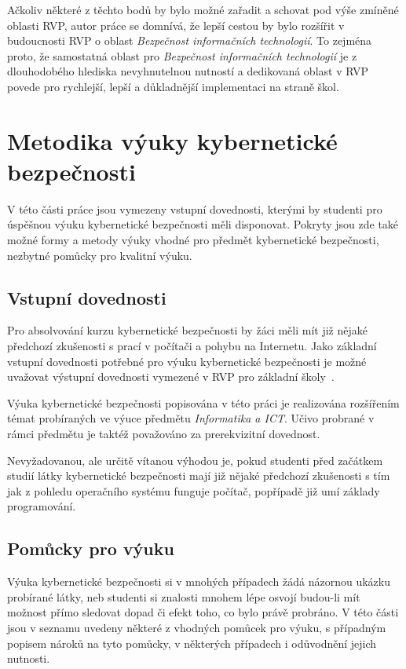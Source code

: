 \documentclass[a4paper, 12pt]{article}
\begin{document}
Ačkoliv některé z těchto bodů by bylo možné zařadit a schovat pod výše zmíněné oblasti RVP, autor práce se domnívá, že lepší cestou by bylo rozšířit v budoucnosti RVP o oblast \textit{Bezpečnost informačních technologií}. To zejména proto, že samostatná oblast pro \textit{Bezpečnost informačních technologií} je z dlouhodobého hlediska nevyhnutelnou nutností a dedikovaná oblast v RVP povede pro rychlejší, lepší a důkladnější implementaci na straně škol.


\newpage
\section{Metodika výuky kybernetické bezpečnosti}
V této části práce jsou vymezeny vstupní dovednosti, kterými by studenti pro úspěšnou výuku kybernetické bezpečnosti měli disponovat. Pokryty jsou zde také možné formy a metody výuky vhodné pro předmět kybernetické bezpečnosti, nezbytné pomůcky pro kvalitní výuku.

\subsection{Vstupní dovednosti}
Pro absolvování kurzu kybernetické bezpečnosti by žáci měli mít již nějaké předchozí zkušenosti s prací v počítači a pohybu na Internetu. Jako základní vstupní dovednosti potřebné pro výuku kybernetické bezpečnosti je možné uvažovat výstupní dovednosti vymezené v RVP pro základní školy~\cite{rvpElementary}. 

Výuka kybernetické bezpečnosti popisována v této práci je realizována rozšířením témat probíraných ve výuce předmětu \textit{Informatika a ICT}. Učivo probrané v rámci předmětu je taktéž považováno za prerekvizitní dovednost.

Nevyžadovanou, ale určitě vítanou výhodou je, pokud studenti před začátkem studií látky kybernetické bezpečnosti mají již nějaké předchozí zkušenosti s tím jak z pohledu operačního systému funguje počítač, popřípadě již umí základy programování.

\subsection{Pomůcky pro výuku}
Výuka kybernetické bezpečnosti si v mnohých případech žádá názornou ukázku probírané látky, neb studenti si znalosti mnohem lépe osvojí budou-li mít možnost přímo sledovat dopad či efekt toho, co bylo právě probráno. V této části jsou v seznamu uvedeny některé z vhodných pomůcek pro výuku, s případným popisem nároků na tyto pomůcky, v některých případech i odůvodnění jejich nutnosti.
\end{document}
